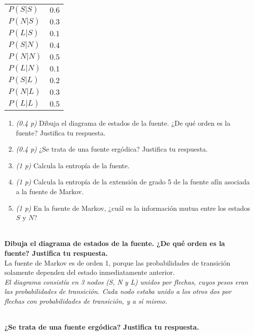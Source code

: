 \documentclass{article}
\begin{document}
\begin{center}
\begin{tabular}{l|r}

$P(S|S)$&$0.6$\\
$P(N|S)$&$0.3$\\
$P(L|S)$&$0.1$\\
$P(S|N)$&$0.4$\\
$P(N|N)$&$0.5$\\
$P(L|N)$&$0.1$\\
$P(S|L)$&$0.2$\\
$P(N|L)$&$0.3$\\
$P(L|L)$&$0.5$\\

\end{tabular}
\end{center}

\begin{enumerate}
    \item\textit{(0.4 p)} Dibuja el diagrama de estados de la fuente. ¿De qué orden es la fuente? Justifica tu respuesta.
    \item\textit{(0.4 p)} ¿Se trata de una fuente ergódica? Justifica tu respuesta.
    \item\textit{(1 p)} Calcula la entropía de la fuente.
    \item\textit{(1 p)} Calcula la entropía de la extensión de grado 5 de la fuente afín asociada a la fuente de Markov.
    \item\textit{(1 p)} En la fuente de Markov, ¿cuál es la información mutua entre los estados $S$ y $N$?
\end{enumerate}

~\\
\textbf{Dibuja el diagrama de estados de la fuente. ¿De qué orden es la fuente? Justifica tu respuesta.}\\

La fuente de Markov es de orden 1, porque las probabilidades de transición solamente dependen del estado inmediatamente anterior.\\

\textit{El diagrama consistía en 3 nodos (S, N y L) unidos por flechas, cuyos pesos eran las probabilidades de transición. Cada nodo estaba unido a los otros dos por flechas con probabilidades de transición, y a sí mismo.}

~\\
\textbf{¿Se trata de una fuente ergódica? Justifica tu respuesta.}\\
\end{document}
